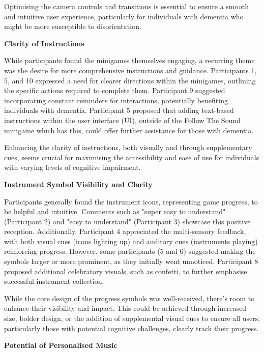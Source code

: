\documentclass{l4proj}
\begin{document}
Optimising the camera controls and transitions is essential to ensure a smooth and intuitive user experience, particularly for individuals with dementia who might be more susceptible to disorientation.
\newline

\textbf{Clarity of Instructions}

While participants found the minigames themselves engaging, a recurring theme was the desire for more comprehensive instructions and guidance. Participants 1, 5, and 10 expressed a need for clearer directions within the minigames, outlining the specific actions required to complete them. Participant 9 suggested incorporating constant reminders for interactions, potentially benefiting individuals with dementia. Participant 5 proposed that adding text-based instructions within the user interface (UI), outside of the Follow The Sound minigame which has this, could offer further assistance for those with dementia. 

Enhancing the clarity of instructions, both visually and through supplementary cues, seems crucial for maximising the accessibility and ease of use for individuals with varying levels of cognitive impairment.
\newline

\textbf{Instrument Symbol Visibility and Clarity}

Participants generally found the instrument icons, representing game progress, to be helpful and intuitive. Comments such as "super easy to understand" (Participant 2) and "easy to understand"  (Participant 3) showcase this positive reception. Additionally, Participant 4  appreciated the multi-sensory feedback, with both visual cues (icons lighting up) and auditory cues (instruments playing) reinforcing progress.  However, some participants (5 and 6) suggested making the symbols larger or more prominent, as they initially went unnoticed. Participant 8 proposed additional celebratory visuals, such as confetti, to further emphasise successful instrument collection. 

While the core design of the progress symbols was well-received, there's room to enhance their visibility and impact. This could be achieved through increased size, bolder design, or the addition of supplemental visual cues to ensure all users, particularly those with potential cognitive challenges, clearly track their progress.
\newline

\textbf{Potential of Personalised Music}
\end{document}
